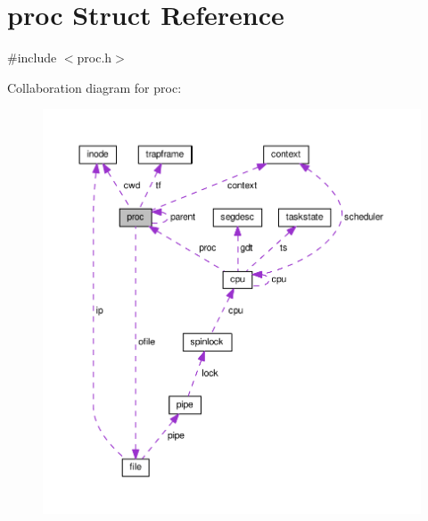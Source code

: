 \hypertarget{structproc}{\section{proc Struct Reference}
\label{structproc}
}


{\ttfamily \#include $<$proc.\-h$>$}



Collaboration diagram for proc\-:
\nopagebreak
\begin{figure}[H]
\begin{center}
\leavevmode
\includegraphics[width=350pt]{structproc__coll__graph}
\end{center}
\end{figure}
